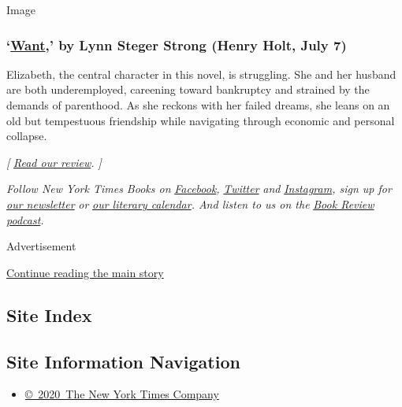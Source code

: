 Image

\hypertarget{want-by-lynn-steger-strong-henry-holt-july-7}{%
\subsubsection{\texorpdfstring{`\href{https://us.macmillan.com/books/9781250247537}{Want},'
by Lynn Steger Strong (Henry Holt, July
7)}{`Want,' by Lynn Steger Strong (Henry Holt, July 7)}}\label{want-by-lynn-steger-strong-henry-holt-july-7}}

Elizabeth, the central character in this novel, is struggling. She and
her husband are both underemployed, careening toward bankruptcy and
strained by the demands of parenthood. As she reckons with her failed
dreams, she leans on an old but tempestuous friendship while navigating
through economic and personal collapse.

\emph{{[}}
\href{https://www.nytimes.com/2020/07/07/books/review/want-lynn-steger-strong.html}{\emph{Read
our review}}\emph{. {]}}

\emph{Follow New York Times Books on}
\href{https://www.facebook.com/nytbooks/}{\emph{Facebook}}\emph{,}
\href{https://twitter.com/nytimesbooks}{\emph{Twitter}} \emph{and}
\href{https://www.instagram.com/nytbooks/}{\emph{Instagram}}\emph{, sign
up for}
\href{https://www.nytimes.com/newsletters/books-review}{\emph{our
newsletter}} \emph{or}
\href{https://www.nytimes.com/interactive/2017/books/books-calendar.html}{\emph{our
literary calendar}}\emph{. And listen to us on the}
\href{https://www.nytimes.com/column/book-review-podcast}{\emph{Book
Review podcast}}\emph{.}

Advertisement

\protect\hyperlink{after-bottom}{Continue reading the main story}

\hypertarget{site-index}{%
\subsection{Site Index}\label{site-index}}

\hypertarget{site-information-navigation}{%
\subsection{Site Information
Navigation}\label{site-information-navigation}}

\begin{itemize}
\tightlist
\item
  \href{https://help.nytimes.com/hc/en-us/articles/115014792127-Copyright-notice}{©~2020~The
  New York Times Company}
\end{itemize}


